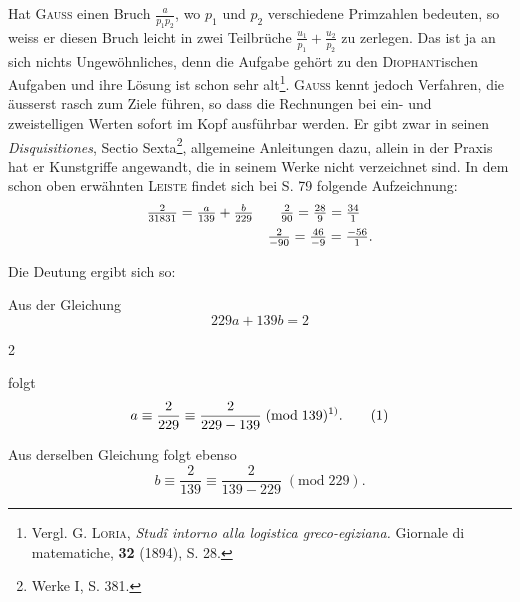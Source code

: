 Hat \textsc{Gauss} einen Bruch $\frac{a}{p_1p_2}$, wo $p_1$ und $p_2$ verschiedene Primzahlen bedeuten, so weiss er diesen Bruch leicht in zwei Teilbrüche $\frac{u_1}{p_1}+\frac{u_2}{p_2}$ zu zerlegen. Das ist ja an sich nichts Ungewöhnliches, denn die Aufgabe gehört
zu den \textsc{Diophant}ischen Aufgaben und ihre Lösung ist schon sehr alt\footnote{Vergl. \textsc{G. Loria}, \textit{Studî intorno alla logistica greco-egiziana.} Giornale di matematiche, \textbf{32} (1894), S. 28.}. \textsc{Gauss}
kennt jedoch Verfahren, die äusserst rasch zum Ziele führen, so dass die
Rechnungen bei ein- und zweistelligen Werten sofort im Kopf ausführbar
werden. Er gibt zwar in seinen \textit{Disquisitiones}, Sectio Sexta\footnote{Werke I, S. 381.}, allgemeine Anleitungen dazu, allein in der Praxis hat er Kunstgriffe angewandt, die in
seinem Werke nicht verzeichnet sind. In dem schon oben erwähnten \textsc{Leiste}
findet sich bei S. 79 folgende Aufzeichnung:
\[
\begin{array}{c@{\quad}c}
\frac{2}{31831}=\frac{a}{139}+\frac{b}{229}&\frac{2}{90}=\frac{28}{9}=\frac{34}{1}\\[5pt]
&\frac{2}{-90}=\frac{46}{-9}=\frac{-56}{1}.
\end{array}
\]
\par\noindent\hspace*{\parindent}Die Deutung ergibt sich so:
\par\noindent\hspace*{\parindent}Aus der Gleichung
\[
229a+139b=2
\]
\par\smallskip{}\hfill{\small 2}\par
\clearpage{}
\setcounter{footnote}{0}
\noindent folgt
\begingroup\makeatletter\tagsleft@true\let\veqno\leqno\makeatother
\begin{equation*}
a\equiv\frac{2}{229}\equiv\frac{2}{229-139}\; (\mathrm{mod}\;139)\text{\textsuperscript{1)}}.\tag*{(1)}
\end{equation*}
\setcounter{footnote}{1}
\par\noindent\hspace*{\parindent}Aus derselben Gleichung folgt ebenso
\begin{equation*}
b\equiv\frac{2}{139}\equiv\frac{2}{139-229}\; (\mathrm{mod}\;229).\tag*{(2)}
\end{equation*}
